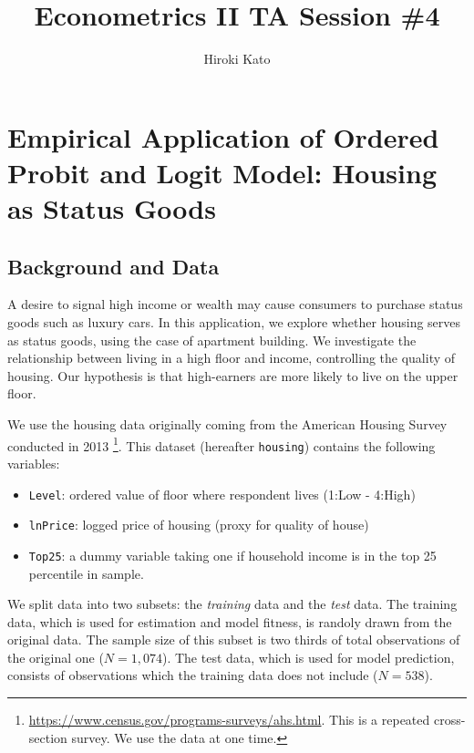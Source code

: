 \documentclass[
  12pt,
]{article}
\title{Econometrics II TA Session \#4}
\author{Hiroki Kato}
\date{}
\providecommand{\tightlist}{%
  \setlength{\itemsep}{0pt}\setlength{\parskip}{0pt}}
\begin{document}
\maketitle

\hypertarget{empirical-application-of-ordered-probit-and-logit-model-housing-as-status-goods}{%
\section{Empirical Application of Ordered Probit and Logit Model:
Housing as Status
Goods}\label{empirical-application-of-ordered-probit-and-logit-model-housing-as-status-goods}}

\hypertarget{background-and-data}{%
\subsection{Background and Data}\label{background-and-data}}

A desire to signal high income or wealth may cause consumers to purchase
status goods such as luxury cars. In this application, we explore
whether housing serves as status goods, using the case of apartment
building. We investigate the relationship between living in a high floor
and income, controlling the quality of housing. Our hypothesis is that
high-earners are more likely to live on the upper floor.

We use the housing data originally coming from the American Housing
Survey conducted in 2013 \footnote{\url{https://www.census.gov/programs-surveys/ahs.html}.
  This is a repeated cross-section survey. We use the data at one time.}.
This dataset (hereafter \texttt{housing}) contains the following
variables:

\begin{itemize}
\tightlist
\item
  \texttt{Level}: ordered value of floor where respondent lives (1:Low -
  4:High)
\item
  \texttt{lnPrice}: logged price of housing (proxy for quality of house)
\item
  \texttt{Top25}: a dummy variable taking one if household income is in
  the top 25 percentile in sample.
\end{itemize}

We split data into two subsets: the \emph{training} data and the
\emph{test} data. The training data, which is used for estimation and
model fitness, is randoly drawn from the original data. The sample size
of this subset is two thirds of total observations of the original one
(\(N = 1,074\)). The test data, which is used for model prediction,
consists of observations which the training data does not include
(\(N = 538\)).
\end{document}
